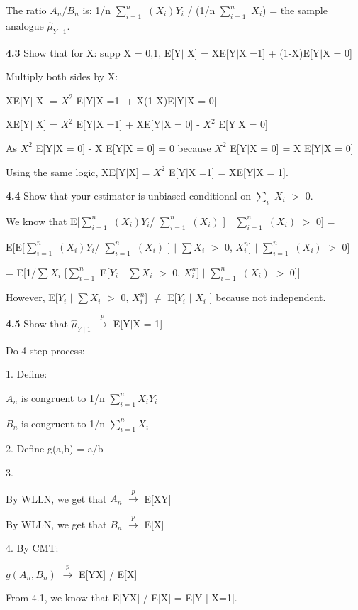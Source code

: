 The ratio $A_{n}/B_{n}$ is: 
1/n $\sum^n_{i=1}$ $(X_{i})Y_{i}$ / (1/n $\sum^n_{i=1}$ $X_{i}$) = the sample analogue $\hat{\mu}_{Y\mid 1}$.


\textbf{4.3} Show that for X: supp X = {0,1}, E[Y$\mid$ X] = XE[Y$\mid$X =1] + (1-X)E[Y$\mid$X = 0]  

Multiply both sides by X:

XE[Y$\mid$ X] = $X^{2}$ E[Y$\mid$X =1] + X(1-X)E[Y$\mid$X = 0]

XE[Y$\mid$ X] = $X^{2}$ E[Y$\mid$X =1] + XE[Y$\mid$X = 0] - $X^{2}$ E[Y$\mid$X = 0]

As $X^{2}$ E[Y$\mid$X = 0] - X E[Y$\mid$X = 0] = 0 because 
$X^{2}$ E[Y$\mid$X = 0] = X E[Y$\mid$X = 0]

Using the same logic, XE[Y$\mid$X] = $X^{2}$ E[Y$\mid$X =1] = XE[Y$\mid$X = 1].

\textbf{4.4}
Show that your estimator is unbiased conditional on $\sum_{i}$ $X_{i}$ $>$ 0.

We know that E[$\sum^n_{i=1}$ $(X_{i})Y_{i}$/ $\sum^n_{i=1}$ $(X_{i})$ ] $\mid$ $\sum^n_{i=1}$ $(X_{i})$ $>$ 0] =

E[E[$\sum^n_{i=1}$ $(X_{i})Y_{i}$/ $\sum^n_{i=1}$ $(X_{i})$ ] $\mid$  $\sum X_{i}$ $>$ 0, $X_{i}^n$] $\mid$ $\sum^n_{i=1}$ $(X_{i})$ $>$ 0]

= E[1/$\sum X_{i}$ [$\sum^n_{i=1}$ E[$Y_{i}$ $\mid$  $\sum X_{i}$ $>$ 0, $X_{i}^n$] $\mid$ $\sum^n_{i=1}$ $(X_{i})$ $>$ 0]]

However, E[$Y_{i}$ $\mid$  $\sum X_{i}$ $>$ 0, $X_{i}^n$] $\neq$ E[$Y_{i}$ $\mid$ $X_{i}$ ] because not independent.

\textbf{4.5} Show that $\hat{\mu}_{Y\mid1}$ $\xrightarrow{p}$ E[Y$\mid$X = 1]

Do 4 step process:

1.
Define:

$A_{n}$ is congruent to 1/n $\sum^n_{i=1} X_{i}Y_{i}$

$B_{n}$ is congruent to 1/n $\sum^n_{i=1} X_{i}$

2. Define g(a,b) = a/b

3. 

By WLLN, we get that $A_{n}$ $\xrightarrow{p}$ E[XY]

By WLLN, we get that $B_{n}$ $\xrightarrow{p}$ E[X]

4. By CMT:

$g(A_{n}, B_{n})$ $\xrightarrow{p}$ E[YX] / E[X] 

From 4.1, we know that E[YX] / E[X] = E[Y $\mid$ X=1].

